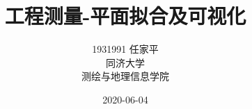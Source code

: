 \documentclass[a4paper, UTF8, 12pt]{article}
\begin{document}
\title{\Huge 工程测量-平面拟合及可视化}
\author{\Large 
        1931991 任家平 \\[12pt]
        同济大学 \\[12pt]
        测绘与地理信息学院}
\date{2020-06-04}
\maketitle
\thispagestyle{empty}



\newpage
{}
\tableofcontents

\newpage
{}






\listoffigures
{}
\listoftables
{}
\newpage
\nocite{*}


\end{document}

